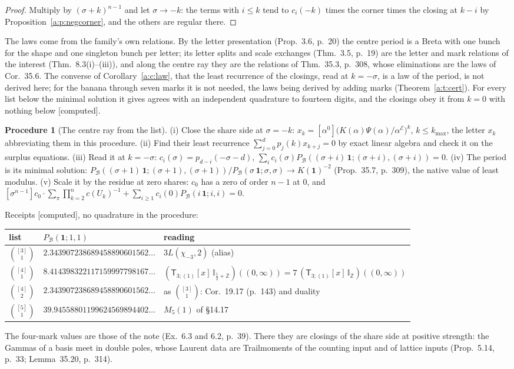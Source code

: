 \documentclass[11pt]{article}
\newcommand{\cE}{\mathcal E}
\newcommand{\cB}{\mathcal B}
\newcommand{\one}{\mathbf 1}
\newcommand{\sT}{\mathsf T}
\newcommand{\IZ}{\mathbb I_{\mathbb Z}}
\newcommand{\Ilat}[1]{\mathbb I_{#1}}
\newcommand{\Tx}[3]{(\sT_{#1;(1)}[x]\,#2)((#3,\infty))}
\newcommand{\Pc}[1]{P_{\cB}(#1\,\one;#1,#1)}
\newcommand{\Clo}[1]{[\alpha^0]\big(K(\alpha)\Psi(\alpha)/\alpha^{\cE}\big)^{#1}}
\newcommand{\Cor}{\sum_\pi\prod_{k=2}^nc(U_k)^{-1}}
\theoremstyle{plain}
\theoremstyle{definition}
\newtheorem{procedure}[proposition]{Procedure}
\theoremstyle{remark}
\newcommand{\computed}{\textup{[computed]}}
\begin{document}
\begin{proof}
Multiply by $(\sigma+k)^{n-1}$ and let $\sigma\to-k$: the terms with $i\le k$ tend to $c_i(-k)$ times the corner times the closing at $k-i$ by Proposition~\ref{a:p:negcorner}, and the others are regular there.
\end{proof}

The laws come from the family's own relations. By the letter presentation (Prop.~3.6, p.~20) the centre period is a Breta with one bunch for the shape and one singleton bunch per letter; its letter splits and scale exchanges (Thm.~3.5, p.~19) are the letter and mark relations of the interest (Thm.~8.3(i)--(iii)), and along the centre ray they are the relations of Thm.~35.3, p.~308, whose eliminations are the laws of Cor.~35.6. The converse of Corollary~\ref{a:c:law}, that the least recurrence of the closings, read at $k=-\sigma$, is a law of the period, is not derived here; for the banana through seven marks it is not needed, the laws being derived by adding marks (Theorem~\ref{a:t:cert}). For every list below the minimal solution it gives agrees with an independent quadrature to fourteen digits, and the closings obey it from $k=0$ with nothing below \computed.

\begin{procedure}[The centre ray from the list]\label{a:p:proc}
(i) Close the share side at $\sigma=-k$: $x_k=\Clo k$, $k\le k_{\max}$, the letter $x_k$ abbreviating them in this procedure. (ii) Find their least recurrence $\sum_{j=0}^dp_j(k)x_{k+j}=0$ by exact linear algebra and check it on the surplus equations. (iii) Read it at $k=-\sigma$: $c_i(\sigma)=p_{d-i}(-\sigma-d)$, $\sum_ic_i(\sigma)\Pc{(\sigma+i)}=0$. (iv) The period is its minimal solution: $\Pc{(\sigma+1)}/\Pc\sigma\to K(\one)^{-2}$ (Prop.~35.7, p.~309), the native value of least modulus. (v) Scale it by the residue at zero shares: $c_0$ has a zero of order $n-1$ at $0$, and $[\sigma^{n-1}]c_0\cdot\Cor+\sum_{i\ge1}c_i(0)\Pc i=0$.
\end{procedure}

\noindent Receipts \computed, no quadrature in the procedure:
\begin{center}
\begin{tabular}{lll}
\toprule
list & $P_{\cB}(\one;1,1)$ & reading\\ \midrule
$\binom{[3]}1$ & $2.343907238689458890601562\ldots$ & $3L(\chi_{-3},2)$ (alias)\\
$\binom{[4]}1$ & $8.414398322117159997798167\ldots$ & $\Tx{3}{\Ilat{\frac12+\mathbb Z}}{0}=7\,\Tx{3}{\IZ}{0}$\\
$\binom{[4]}2$ & $2.343907238689458890601562\ldots$ & as $\binom{[3]}1$: Cor.~19.17 (p.~143) and duality\\
$\binom{[5]}1$ & $39.94558801199624569894402\ldots$ & $M_5(1)$ of \S14.17\\
\bottomrule
\end{tabular}
\end{center}
The four-mark values are those of the note (Ex.~6.3 and 6.2, p.~39). There they are closings of the share side at positive strength: the Gammas of a basis meet in double poles, whose Laurent data are Trailmoments of the counting input and of lattice inputs (Prop.~5.14, p.~33; Lemma~35.20, p.~314).
\end{document}

